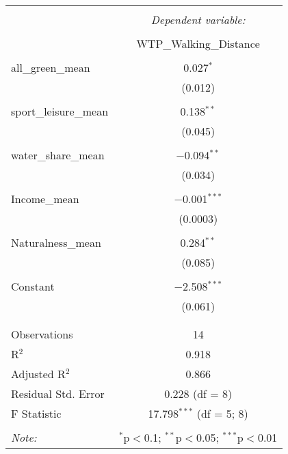 
\begin{table}[!htbp] \centering 
  \caption{} 
  \label{} 
\begin{tabular}{@{\extracolsep{5pt}}lc} 
\\[-1.8ex]\hline 
\hline \\[-1.8ex] 
 & \multicolumn{1}{c}{\textit{Dependent variable:}} \\ 
\cline{2-2} 
\\[-1.8ex] & WTP\_Walking\_Distance \\ 
\hline \\[-1.8ex] 
 all\_green\_mean & 0.027$^{*}$ \\ 
  & (0.012) \\ 
  & \\ 
 sport\_leisure\_mean & 0.138$^{**}$ \\ 
  & (0.045) \\ 
  & \\ 
 water\_share\_mean & $-$0.094$^{**}$ \\ 
  & (0.034) \\ 
  & \\ 
 Income\_mean & $-$0.001$^{***}$ \\ 
  & (0.0003) \\ 
  & \\ 
 Naturalness\_mean & 0.284$^{**}$ \\ 
  & (0.085) \\ 
  & \\ 
 Constant & $-$2.508$^{***}$ \\ 
  & (0.061) \\ 
  & \\ 
\hline \\[-1.8ex] 
Observations & 14 \\ 
R$^{2}$ & 0.918 \\ 
Adjusted R$^{2}$ & 0.866 \\ 
Residual Std. Error & 0.228 (df = 8) \\ 
F Statistic & 17.798$^{***}$ (df = 5; 8) \\ 
\hline 
\hline \\[-1.8ex] 
\textit{Note:}  & \multicolumn{1}{r}{$^{*}$p$<$0.1; $^{**}$p$<$0.05; $^{***}$p$<$0.01} \\ 
\end{tabular} 
\end{table} 
